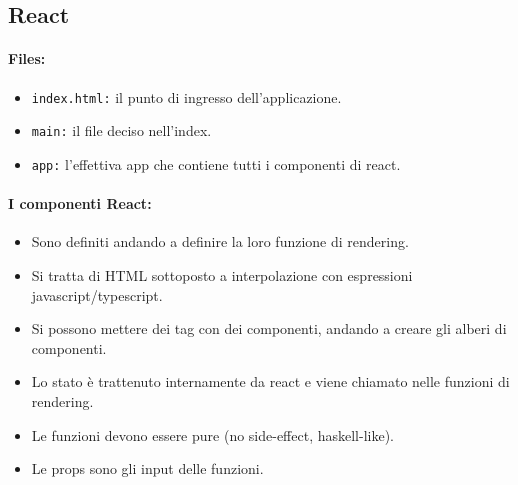 \subsection{React}





\paragraph{Files:}

\begin{itemize}
	\item \texttt{index.html:} il punto di ingresso dell'applicazione.
	\item \texttt{main:} il file deciso nell'index.
	\item \texttt{app:} l'effettiva app che contiene tutti i componenti di react.
\end{itemize}


\paragraph{I componenti React:}

\begin{itemize}
	\item Sono definiti andando a definire la loro funzione di rendering.
	\item Si tratta di HTML sottoposto a interpolazione con espressioni javascript/typescript.
	\item Si possono mettere dei tag con dei componenti, andando a creare gli alberi di componenti.
	\item Lo stato è trattenuto internamente da react e viene chiamato nelle funzioni di rendering.
	\item Le funzioni devono essere pure (no side-effect, haskell-like).
	\item Le props sono gli input delle funzioni.
\end{itemize}






